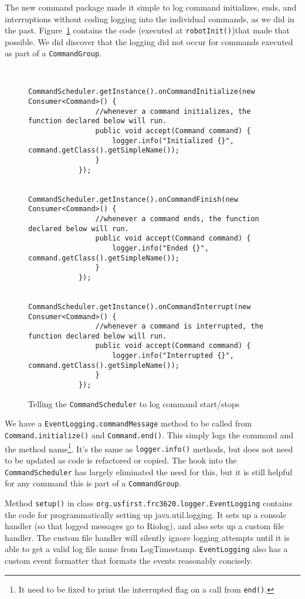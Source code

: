 \documentclass[]{article}
\newcommand{\zztt}[1]{{\texttt{\footnotesize{#1}}}}
\begin{document}
The new command package made it simple to log command initializes, ends, and interruptions without coding logging into the individual commands, as we did in the past. Figure~\ref{fig:commandhook} contains the code (executed at \zztt{robotInit()})that made that possible.
We did discover that the logging did not occur for commands executed as part of a \zztt{CommandGroup}.
\begin{figure}[h]
	\begin{mdframed}
		\begin{lstlisting}[basicstyle=\ttfamily\tiny]
			
			CommandScheduler.getInstance().onCommandInitialize(new Consumer<Command>() {
				//whenever a command initializes, the function declared below will run.
				public void accept(Command command) {
					logger.info("Initialized {}", command.getClass().getSimpleName());
				}
			});
			
			CommandScheduler.getInstance().onCommandFinish(new Consumer<Command>() {
				//whenever a command ends, the function declared below will run.
				public void accept(Command command) {
					logger.info("Ended {}", command.getClass().getSimpleName());
				}
			});
			
			CommandScheduler.getInstance().onCommandInterrupt(new Consumer<Command>() {
				//whenever a command is interrupted, the function declared below will run.
				public void accept(Command command) {
					logger.info("Interrupted {}", command.getClass().getSimpleName());
				}
			});
		\end{lstlisting}
		\caption{Telling the \zztt{CommandScheduler} to log command start/stops}
		\label{fig:commandhook}
	\end{mdframed}
\end{figure}

We have a \zztt{EventLogging.commandMessage} method to be called from \zztt{Command.initialize()} and \zztt{Command.end()}. This simply logs the command and the method name\footnote{It need to be fixed to print the interrupted flag on a call from \zztt{end()}.}. It's the same as \zztt{logger.info()} methods, but does not need to be updated as code is refactored or copied. The hook into the \zztt{CommandScheduler} has largely eliminated the need for this, but it is still helpful for any command this is part of a \zztt{CommandGroup}.

Method \zztt{setup()} in class \zztt{org.usfirst.frc3620.logger.EventLogging} contains the code for programmatically setting up java.util.logging.
It sets up a console handler (so that logged messages go to Riolog), and also sets up a custom file handler.
The custom file handler will silently ignore logging attempts until it is able to get a valid log file name from LogTimestamp.
\zztt{EventLogging} also has a custom event formatter that formats the events reasonably concisely.
\end{document}

